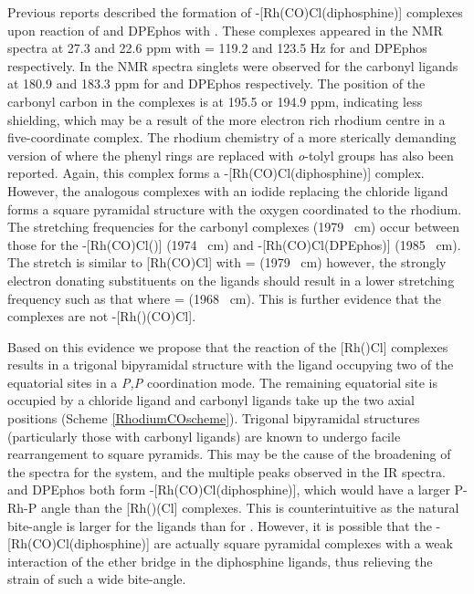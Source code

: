Previous reports described the formation of \trans-{[Rh(CO)Cl(diphosphine)]} complexes upon reaction of \Phxantphos{} and DPEphos with .\cite{Deb2010}  These complexes appeared in the \phosphorus{} NMR spectra at 27.3 and 22.6 ppm with \JRhP{} = 119.2 and 123.5 Hz for \Phxantphos{} and DPEphos respectively.  In the \carbon{} NMR spectra singlets were observed for the carbonyl ligands at 180.9 and 183.3 ppm for \Phxantphos{} and DPEphos respectively.  The position of the carbonyl carbon in the \tBuxantphos{} complexes is at 195.5 or 194.9 ppm, indicating less shielding, which may be a result of the more electron rich rhodium centre in a five-coordinate complex.  The rhodium chemistry of a more sterically demanding version of \Phxantphos{} where the phenyl rings are replaced with \emph{o}-tolyl groups has also been reported.\cite{Williams2011}  Again, this complex forms a \trans-[Rh(CO)Cl(diphosphine)] complex.  However, the analogous complexes with an iodide replacing the chloride ligand forms a square pyramidal structure with the oxygen coordinated to the rhodium.  The  stretching frequencies for the \tBuxantphos{} carbonyl complexes (1979 \si{\per\centi\metre}) occur between those for the \trans-[Rh(CO)Cl(\Phxantphos)] (1974 \si{\per\centi\metre}) and \trans-[Rh(CO)Cl(DPEphos)] (1985 \si{\per\cm}).  The  stretch is similar to [Rh(CO)Cl] with  =  (1979 \si{\per\centi\metre}) however, the strongly electron donating \tBu{} substituents on the \tBuxantphos{} ligands should result in a lower stretching frequency such as that where  =  (1968 \si{\per\cm}).\cite{Banger2009}  This is further evidence that the \tBuxantphos{} complexes are not \trans-[Rh(\tBuxantphos)(CO)Cl].  


Based on this evidence we propose that the reaction of the [Rh(\tBuxantphos)Cl] complexes results in a trigonal bipyramidal structure with the \tBuxantphos{} ligand occupying two of the equatorial sites in a \dento{}\emph{P,P}\textprime{} coordination mode.  The remaining equatorial site is occupied by a chloride ligand and carbonyl ligands take up the two axial positions (Scheme \ref{RhodiumCOscheme}).  Trigonal bipyramidal structures (particularly those with carbonyl ligands) are known to undergo facile rearrangement to square pyramids.\cite{Sanger1985} This may be the cause of the broadening of the spectra for the \tButhixantphos{} system, and the multiple peaks observed in the \gls{IR} spectra.  \Phxantphos{} and DPEphos both form \trans{}-[Rh(CO)Cl(diphosphine)], which would have a larger P-Rh-P angle than the [Rh(\tBuxantphos)(Cl] complexes.  This is counterintuitive as the natural bite-angle is larger for the \tBuxantphos{} ligands than for \Phxantphos{}.  However, it is possible that the \trans{}-[Rh(CO)Cl(diphosphine)] are actually square pyramidal complexes with a weak interaction of the ether bridge in the diphosphine ligands, thus relieving the strain of such a wide bite-angle.

